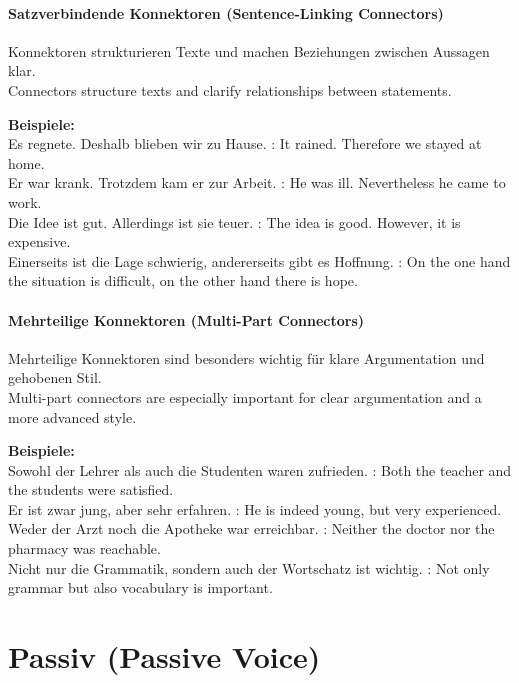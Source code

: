 \documentclass[a4paper]{article}
\begin{document}
    \paragraph{Satzverbindende Konnektoren {\small (Sentence-Linking Connectors)}}
        Konnektoren strukturieren Texte und machen Beziehungen zwischen Aussagen klar.\\
        Connectors structure texts and clarify relationships between statements.
        
        \textbf{Beispiele:}\\
        Es regnete. Deshalb blieben wir zu Hause. : It rained. Therefore we stayed at home.\\
        Er war krank. Trotzdem kam er zur Arbeit. : He was ill. Nevertheless he came to work.\\
        Die Idee ist gut. Allerdings ist sie teuer. : The idea is good. However, it is expensive.\\
        Einerseits ist die Lage schwierig, andererseits gibt es Hoffnung. : On the one hand the situation is difficult, on the other hand there is hope.
    
    \paragraph{Mehrteilige Konnektoren {\small (Multi-Part Connectors)}}
        Mehrteilige Konnektoren sind besonders wichtig für klare Argumentation und gehobenen Stil.\\
        Multi-part connectors are especially important for clear argumentation and a more advanced style.
        
        \textbf{Beispiele:}\\
        Sowohl der Lehrer als auch die Studenten waren zufrieden. : Both the teacher and the students were satisfied.\\
        Er ist zwar jung, aber sehr erfahren. : He is indeed young, but very experienced.\\
        Weder der Arzt noch die Apotheke war erreichbar. : Neither the doctor nor the pharmacy was reachable.\\
        Nicht nur die Grammatik, sondern auch der Wortschatz ist wichtig. : Not only grammar but also vocabulary is important.
    
    
    \section{Passiv {\small (Passive Voice)}}
    
\end{document}
